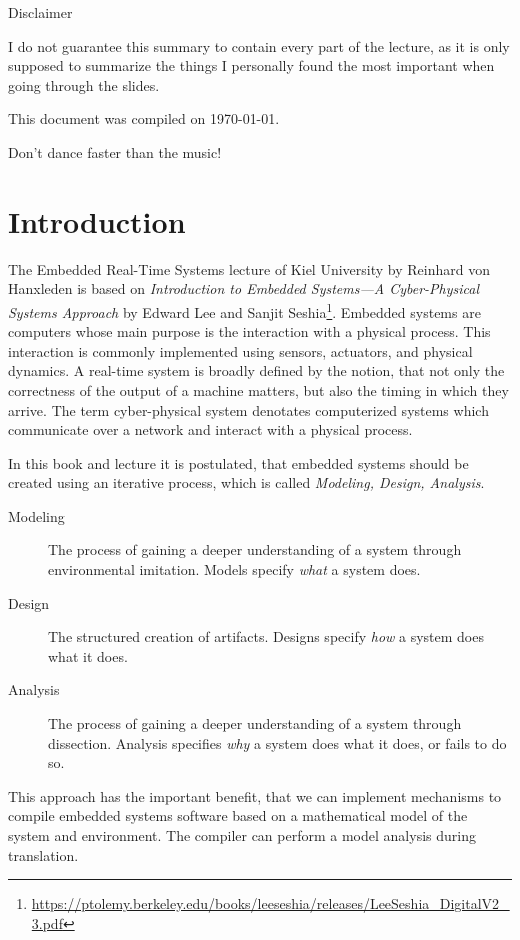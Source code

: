 \begin{center}
    Disclaimer
\end{center}

\noindent
I do not guarantee this summary to contain every part of the lecture, as it is only supposed to summarize the things I personally found the most important when going through the slides.

\begin{center}
    This document was compiled on \today.
\end{center}

\newpage

\epigraph{Don't dance faster than the music!}{}
\section*{Introduction}
The Embedded Real-Time Systems lecture of Kiel University by Reinhard von Hanxleden is based on \emph{Introduction to Embedded Systems---A Cyber-Physical Systems Approach} by Edward Lee and Sanjit Seshia\footnote{\url{https://ptolemy.berkeley.edu/books/leeseshia/releases/LeeSeshia_DigitalV2_3.pdf}}.
Embedded systems are computers whose main purpose is the interaction with a physical process.
This interaction is commonly implemented using sensors, actuators, and physical dynamics.
A real-time system is broadly defined by the notion, that not only the correctness of the output of a machine matters, but also the timing in which they arrive.
The term cyber-physical system denotates computerized systems which communicate over a network and interact with a physical process.

In this book and lecture it is postulated, that embedded systems should be created using an iterative process, which is called \emph{Modeling, Design, Analysis}.
\begin{description}
    \item[Modeling] The process of gaining a deeper understanding of a system through environmental imitation.
        Models specify \emph{what} a system does.
    \item[Design] The structured creation of artifacts.
        Designs specify \emph{how} a system does what it does.
    \item[Analysis] The process of gaining a deeper understanding of a system through dissection.
        Analysis specifies \emph{why} a system does what it does, or fails to do so.
\end{description}
This approach has the important benefit, that we can implement mechanisms to compile embedded systems software based on a mathematical model of the system and environment.
The compiler can perform a model analysis during translation.
